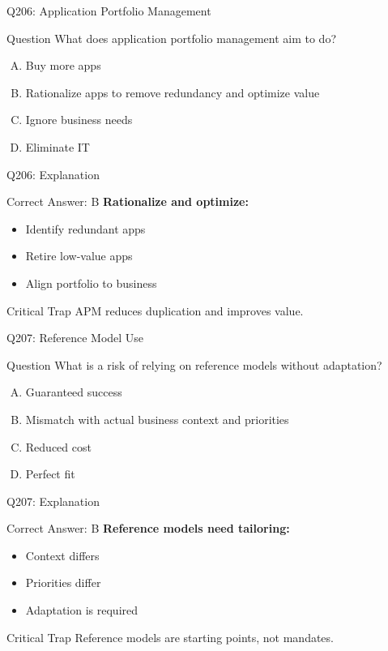\documentclass{beamer}
\begin{document}
	\begin{frame}{Q206: Application Portfolio Management}
		\begin{block}{Question}
			What does application portfolio management aim to do?
		\end{block}
		\begin{enumerate}[(A)]
			\item Buy more apps
			\item Rationalize apps to remove redundancy and optimize value
			\item Ignore business needs
			\item Eliminate IT
		\end{enumerate}
	\end{frame}
	
	\begin{frame}{Q206: Explanation}
		\begin{block}{Correct Answer: B}
			\textbf{Rationalize and optimize:}
			\begin{itemize}
				\item Identify redundant apps
				\item Retire low-value apps
				\item Align portfolio to business
			\end{itemize}
		\end{block}
		\begin{alertblock}{Critical Trap}
			APM reduces duplication and improves value.
		\end{alertblock}
	\end{frame}
	
	\begin{frame}{Q207: Reference Model Use}
		\begin{block}{Question}
			What is a risk of relying on reference models without adaptation?
		\end{block}
		\begin{enumerate}[(A)]
			\item Guaranteed success
			\item Mismatch with actual business context and priorities
			\item Reduced cost
			\item Perfect fit
		\end{enumerate}
	\end{frame}
	
	\begin{frame}{Q207: Explanation}
		\begin{block}{Correct Answer: B}
			\textbf{Reference models need tailoring:}
			\begin{itemize}
				\item Context differs
				\item Priorities differ
				\item Adaptation is required
			\end{itemize}
		\end{block}
		\begin{alertblock}{Critical Trap}
			Reference models are starting points, not mandates.
		\end{alertblock}
	\end{frame}
	
\end{document}
